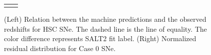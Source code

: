 \documentclass[useamsfonts]{pasj01}
\begin{document}
\begin{figure}[htbp]
\begin{tabular}{cc}
\begin{minipage}{0.5\hsize}
\begin{center}
            \end{center}
        \end{minipage}
    \end{tabular}  \caption{%
    (Left) Relation between the machine predictions and the observed redshifts for HSC SNe.
    The dashed line is the line of equality.
    The color difference represents SALT2 fit label.
    (Right) Normalized residual distribution for Case 0 SNe.
    }%
    \label{fig:redshift_estimation}
\end{figure}

%


%
\end{document}
